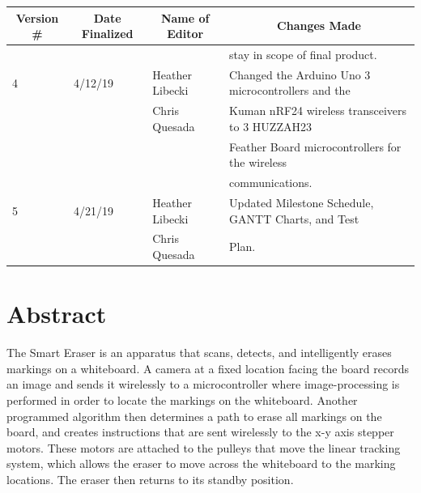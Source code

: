\begin{table} [H]	
	\normalsize
	\centering
	\begin{tabular}{|l|l|l|l|}
		\hline
		\multicolumn{1}{|c|}{\textbf{Version \#}} & 
		\multicolumn{1}{|c|}{\textbf{Date Finalized}} &
		\multicolumn{1}{|c|}{\textbf{Name of Editor}} & 
		\multicolumn{1}{|c|}{\textbf{Changes Made}} \\
		\hline
 	    &          		 &                			   & stay in scope of final product.\\
 	      \hline
	 4 & 4/12/19  	 & Heather Libecki 		   & Changed the Arduino Uno 3 microcontrollers and the \\ 
	    &          		 & Chris Quesada   		   & Kuman nRF24 wireless transceivers to 3 HUZZAH23 \\
	    &        		 &                 			   & Feather Board microcontrollers for the wireless \\ 	
	    &         		 &                			   & communications.	\\      
 	      \hline
 	 5 & 4/21/19  	 & Heather Libecki		   & Updated Milestone Schedule, GANTT Charts, and Test\\ 
 	    &         		 & Chris Quesada  		   & Plan.	\\ 	
	      
		\hline
	\end{tabular} 
\end{table}
 \newpage
 \thispagestyle{empty}
 \section*{Abstract}

The Smart Eraser is an apparatus that scans, detects, and intelligently erases markings on a whiteboard. A camera at a fixed location facing the board records an image and sends it wirelessly to a microcontroller where image-processing is performed in order to locate the markings on the whiteboard. Another programmed algorithm then determines a path to erase all markings on the board, and creates instructions that are sent wirelessly to the x-y axis stepper motors. These motors are attached to the pulleys that move the linear tracking system, which allows the eraser to move across the whiteboard to the marking locations. The eraser then returns to its standby position.

 \newpage
 \thispagestyle{empty}
 \tableofcontents
 \listoffigures
 \thispagestyle{empty}
 \listoftables
 
 \newpage
\setcounter{page}{1}

